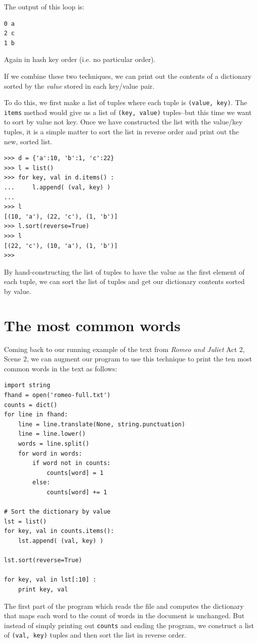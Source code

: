 \documentclass[10pt]{book}
\begin{document}
The output of this loop is:

\beforeverb
\begin{verbatim}
0 a
2 c
1 b
\end{verbatim}
\afterverb
%
Again in hash key order (i.e. no particular order).

If we combine these two techniques, we can print out the contents
of a dictionary sorted by the {\em value} stored in each key/value
pair.

To do this, we first make a list of tuples where each tuple is 
{\tt (value, key)}.  The {\tt items} method would give us a list of 
{\tt (key, value)} tuples--but this time we want to sort by value not key.
Once we have constructed the list with the value/key tuples, it is a simple
matter to sort the list in reverse order and print out the new, sorted list.

\beforeverb
\begin{verbatim}
>>> d = {'a':10, 'b':1, 'c':22}
>>> l = list()
>>> for key, val in d.items() :
...     l.append( (val, key) )
... 
>>> l
[(10, 'a'), (22, 'c'), (1, 'b')]
>>> l.sort(reverse=True)
>>> l
[(22, 'c'), (10, 'a'), (1, 'b')]
>>> 
\end{verbatim}
\afterverb
%
By hand-constructing the list of tuples to have the value as the first
element of each tuple, we can sort the list of tuples and get our dictionary
contents sorted by value.

\section{The most common words}

Coming back to our running example of the text from {\em Romeo and Juliet} 
Act 2, Scene 2, we can augment our program to use this technique to 
print the ten most common words in the text as follows:

\beforeverb
\begin{verbatim}
import string
fhand = open('romeo-full.txt')
counts = dict()
for line in fhand:
    line = line.translate(None, string.punctuation)
    line = line.lower()
    words = line.split()
    for word in words:
        if word not in counts:
            counts[word] = 1
        else:
            counts[word] += 1

# Sort the dictionary by value
lst = list()
for key, val in counts.items():
    lst.append( (val, key) )

lst.sort(reverse=True)

for key, val in lst[:10] :
    print key, val
\end{verbatim}
\afterverb
%
The first part of the program which reads the file and computes 
the dictionary that maps each word to the count of words in the 
document is unchanged.  But instead of simply printing out 
{\tt counts} and ending the program, we construct a list 
of {\tt (val, key)} tuples and then sort the list in reverse order.
\end{document}
